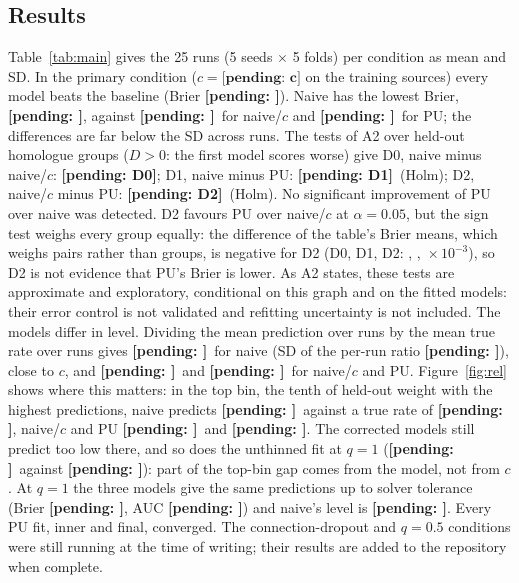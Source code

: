 \documentclass[conference]{IEEEtran}
\newcommand{\pending}[1]{\textbf{[pending: #1]}}
\providecommand{\CPrimary}{\pending{c}}\providecommand{\MeanY}{\pending{rate}}\providecommand{\PairsBelowFive}{\pending{share}}
\providecommand{\TestDzero}{\pending{D0}}\providecommand{\TestDone}{\pending{D1}}\providecommand{\TestDtwo}{\pending{D2}}
\providecommand{\BrierNaive}{\pending{}}\providecommand{\BrierNaiveC}{\pending{}}\providecommand{\BrierPU}{\pending{}}\providecommand{\BrierBase}{\pending{}}
\providecommand{\LevelNaive}{\pending{}}\providecommand{\LevelNaiveC}{\pending{}}\providecommand{\LevelPU}{\pending{}}\providecommand{\LevelNaiveSD}{\pending{}}
\providecommand{\TopPNaive}{\pending{}}\providecommand{\TopPNaiveC}{\pending{}}\providecommand{\TopPPU}{\pending{}}\providecommand{\TopY}{\pending{}}
\providecommand{\LevelQone}{\pending{}}\providecommand{\BrierQone}{\pending{}}\providecommand{\AUCQone}{\pending{}}\providecommand{\TopPQone}{\pending{}}\providecommand{\TopYQone}{\pending{}}
\begin{document}
\subsection{Results}
Table~\ref{tab:main} gives the 25 runs (5 seeds $\times$ 5 folds) per condition as mean and SD. In the primary condition ($c=\CPrimary$ on the training sources) every model beats the baseline (Brier \BrierBase). Naive has the lowest Brier, \BrierNaive, against \BrierNaiveC\ for naive/$c$ and \BrierPU\ for PU; the differences are far below the SD across runs. The tests of A2 over held-out homologue groups ($D>0$: the first model scores worse) give D0, naive minus naive/$c$: \TestDzero; D1, naive minus PU: \TestDone\ (Holm); D2, naive/$c$ minus PU: \TestDtwo\ (Holm). No significant improvement of PU over naive was detected. D2 favours PU over naive/$c$ at $\alpha=0.05$, but the sign test weighs every group equally: the difference of the table's Brier means, which weighs pairs rather than groups, is negative for D2 (D0, D1, D2: \PooledDzero, \PooledDone, \PooledDtwo${}\times10^{-3}$), so D2 is not evidence that PU's Brier is lower. As A2 states, these tests are approximate and exploratory, conditional on this graph and on the fitted models: their error control is not validated and refitting uncertainty is not included. The models differ in level. Dividing the mean prediction over runs by the mean true rate over runs gives \LevelNaive\ for naive (SD of the per-run ratio \LevelNaiveSD), close to $c$, and \LevelNaiveC\ and \LevelPU\ for naive/$c$ and PU. Figure~\ref{fig:rel} shows where this matters: in the top bin, the tenth of held-out weight with the highest predictions, naive predicts \TopPNaive\ against a true rate of \TopY, naive/$c$ and PU \TopPNaiveC\ and \TopPPU. The corrected models still predict too low there, and so does the unthinned fit at $q=1$ (\TopPQone\ against \TopYQone): part of the top-bin gap comes from the model, not from $c$. At $q=1$ the three models give the same predictions up to solver tolerance (Brier \BrierQone, AUC \AUCQone) and naive's level is \LevelQone. Every PU fit, inner and final, converged. The connection-dropout and $q=0.5$ conditions were still running at the time of writing; their results are added to the repository when complete.

\begin{table}[t]\centering\caption{Held-out scores against the true labels $y$, mean (SD) over 25 runs. Brier $\times10^{3}$. Naive and naive/$c$ rank alike where they share $\lambda$, up to ties from the clip at 1; each is computed separately.}\label{tab:main}
\IfFileExists{table_main.tex}{\resizebox{\columnwidth}{!}{}}{\pending{table}}
\end{table}
\end{document}
